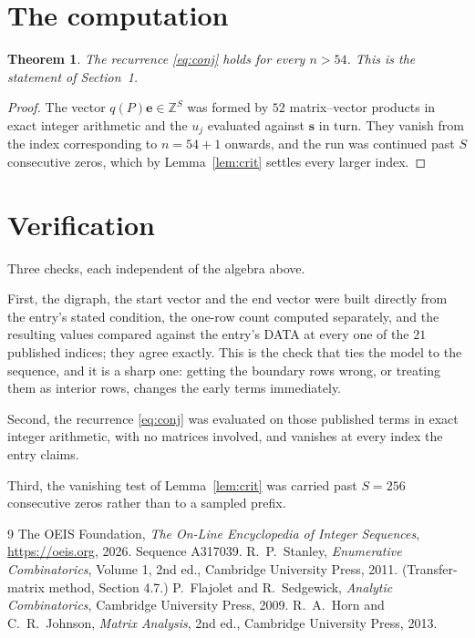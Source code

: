 \documentclass[11pt,a4paper]{article}
\theoremstyle{plain}
\newtheorem{theorem}{Theorem}
\theoremstyle{definition}
\begin{document}
\section{The computation}

\begin{theorem}
The recurrence \eqref{eq:conj} holds for every $n>54$. This is the statement of
Section~1.
\end{theorem}

\begin{proof}
The vector $q(P)\mathbf{e}\in\mathbb{Z}^{S}$ was formed by $52$ matrix--vector
products in exact integer arithmetic and the $u_j$ evaluated against $\mathbf{s}$ in turn.
They vanish from the index corresponding to $n=54+1$ onwards, and the run was continued
past $S$ consecutive zeros, which by Lemma~\ref{lem:crit} settles every larger index.
\end{proof}

\section{Verification}

Three checks, each independent of the algebra above.

First, the digraph, the start vector and the end vector were built directly from the
entry's stated condition, the one-row count computed separately, and the resulting values
compared against the entry's DATA at every one of the $21$ published indices; they
agree exactly. This is the check that ties the model to the sequence, and it is a sharp one:
getting the boundary rows wrong, or treating them as interior rows, changes the early terms
immediately.

Second, the recurrence \eqref{eq:conj} was evaluated on those published terms in exact
integer arithmetic, with no matrices involved, and vanishes at every index the entry claims.

Third, the vanishing test of Lemma~\ref{lem:crit} was carried past $S=256$ consecutive
zeros rather than to a sampled prefix.

\begin{thebibliography}{9}
 The OEIS Foundation, \emph{The On-Line Encyclopedia of Integer
Sequences}, \url{https://oeis.org}, 2026. Sequence A317039.
 R.~P.~Stanley, \emph{Enumerative Combinatorics}, Volume 1, 2nd ed.,
Cambridge University Press, 2011. (Transfer-matrix method, Section 4.7.)
 P.~Flajolet and R.~Sedgewick, \emph{Analytic Combinatorics}, Cambridge
University Press, 2009.
 R.~A.~Horn and C.~R.~Johnson, \emph{Matrix Analysis}, 2nd ed., Cambridge
University Press, 2013.
\end{thebibliography}
\end{document}

